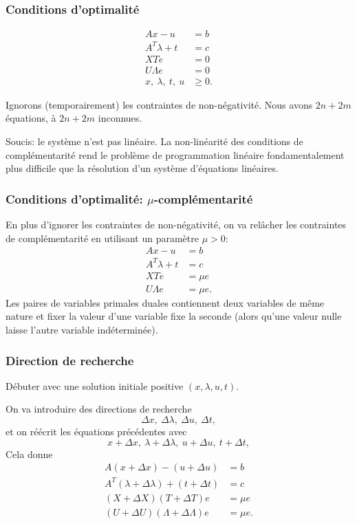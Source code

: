 \documentclass[t,usepdftitle=false]{beamer}
\begin{document}
\begin{frame}
\frametitle{Conditions d'optimalité}

\begin{align*}
Ax - u &= b \\
A^T \lambda + t &= c \\
XTe &= 0\\
U\Lambda e &= 0\\
x,\ \lambda,\ t,\ u &\geq 0.
\end{align*}

\mbox{}

Ignorons (temporairement) les contraintes de non-négativité.
Nous avons $2n + 2m$ équations, à $2n + 2m$ inconnues.

\mbox{}

Soucis: le système n'est pas linéaire. La non-linéarité des conditions de complémentarité rend le problème de programmation linéaire fondamentalement plus difficile que la résolution d'un système d'équations linéaires.

\end{frame}

\begin{frame}
\frametitle{Conditions d'optimalité: $\mu$-complémentarité}

En plus d'ignorer les contraintes de non-négativité, on va relâcher les contraintes de complémentarité en utilisant un paramètre $\mu > 0$:
\begin{align*}
Ax - u &= b \\
A^T \lambda + t &= c \\
XTe &= \mu e\\
U\Lambda e &= \mu e.
\end{align*}
Les paires de variables primales duales contiennent deux variables de même nature et fixer la valeur d'une variable fixe la seconde (alors qu'une valeur nulle laisse l'autre variable indéterminée).

\end{frame}

\begin{frame}
\frametitle{Direction de recherche}

Débuter avec une solution initiale positive $(x, \lambda, u, t)$.

\mbox{}

On va introduire des directions de recherche
\[
\Delta x,\ \Delta \lambda,\ \Delta u,\ \Delta t,
\]
et on réécrit les équations précédentes avec
\[
x + \Delta x,\ \lambda + \Delta \lambda,\ u + \Delta u,\ t + \Delta t,
\]
Cela donne
\begin{align*}
A(x + \Delta x) - (u + \Delta u) &= b \\
A^T (\lambda + \Delta \lambda) + (t + \Delta t) &= c \\
(X + \Delta X)(T + \Delta T)e &= \mu e\\
(U + \Delta U)(\Lambda + \Delta \Lambda)e &= \mu e.
\end{align*}

\end{frame}
\end{document}
